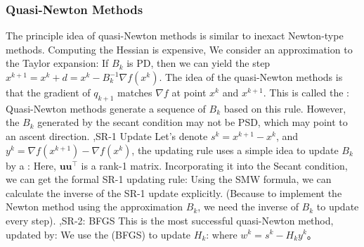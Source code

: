 \documentclass[10pt]{report}
\begin{document}
\subsubsection{Quasi-Newton Methods}
The principle idea of quasi-Newton methods is similar to inexact Newton-type methods. Computing the Hessian is expensive, We consider an approximation
to the Taylor expansion:
If $B_k$ is PD, then we can yield the step $x^{k+1}=x^k+d=x^k-B_k^{-1}\nabla f(x^k)$. The idea of the quasi-Newton methods is that the gradient of $q_{k+1}$ matches
$\nabla f$ at point $x^k$ and $x^{k+1}$. This is called the :
Quasi-Newton methods generate a sequence of $B_k$ based on this rule. However, the $B_k$ generated by the secant condition may not be PSD, which may point to an ascent direction.
\sep{SR-1 Update}
Let's denote $s^k=x^{k+1}-x^k$, and $y^k=\nabla f(x^{k+1})-\nabla f(x^k)$, the  updating rule uses a simple idea to update $B_k$ by a :
Here, $\boldsymbol{u}\boldsymbol{u}^\top$ is a rank-1 matrix. Incorporating it into the Secant condition, we can get the formal SR-1 updating rule:
Using the SMW formula, we can calculate the inverse of the SR-1 update explicitly. (Because to implement the Newton method using the approximation $B_k$, we need the inverse of $B_k$ to update every step).
\sep{SR-2: BFGS}
This is the most successful quasi-Newton method, updated by:
We use the  (BFGS) to update $H_k$:
where $w^k=s^k-H_ky^k$。
\end{document}
